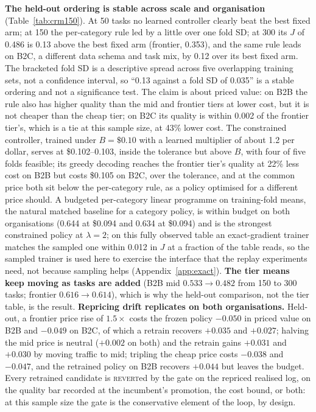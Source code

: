 \documentclass[10pt]{article}
\newcommand{\REVERT}{\textsc{revert}}
\newcommand{\finding}[1]{\textbf{\textcolor{pace}{#1}}}
\begin{document}
\finding{The held-out ordering is stable across scale and organisation} (Table~\ref{tab:crm150}). At 50 tasks no learned controller clearly beat the best fixed arm; at 150 the per-category rule led by a little over one fold SD; at 300 its $J$ of 0.486 is 0.13 above the best fixed arm (frontier, 0.353), and the same rule leads on B2C, a different data schema and task mix, by 0.12 over its best fixed arm. The bracketed fold SD is a descriptive spread across five overlapping training sets, not a confidence interval, so ``0.13 against a fold SD of 0.035'' is a stable ordering and not a significance test. The claim is about priced value: on B2B the rule also has higher quality than the mid and frontier tiers at lower cost, but it is not cheaper than the cheap tier; on B2C its quality is within 0.002 of the frontier tier's, which is a tie at this sample size, at 43\% lower cost. The constrained controller, trained under $B=\$0.10$ with a learned multiplier of about 1.2 per dollar, serves at \$0.102--0.103, inside the tolerance but above $B$, with four of five folds feasible; its greedy decoding reaches the frontier tier's quality at 22\% less cost on B2B but costs \$0.105 on B2C, over the tolerance, and at the common price both sit below the per-category rule, as a policy optimised for a different price should. A budgeted per-category linear programme on training-fold means, the natural matched baseline for a category policy, is within budget on both organisations (0.644 at \$0.094 and 0.634 at \$0.094) and is the strongest constrained policy at $\lambda=2$; on this fully observed table an exact-gradient trainer matches the sampled one within 0.012 in $J$ at a fraction of the table reads, so the sampled trainer is used here to exercise the interface that the replay experiments need, not because sampling helps (Appendix~\ref{app:exact}). \finding{The tier means keep moving as tasks are added} (B2B mid $0.533\to0.482$ from 150 to 300 tasks; frontier $0.616\to0.614$), which is why the held-out comparison, not the tier table, is the result. \finding{Repricing drift replicates on both organisations.} Held-out, a frontier price rise of $1.5\times$ costs the frozen policy $-0.050$ in priced value on B2B and $-0.049$ on B2C, of which a retrain recovers $+0.035$ and $+0.027$; halving the mid price is neutral ($+0.002$ on both) and the retrain gains $+0.031$ and $+0.030$ by moving traffic to mid; tripling the cheap price costs $-0.038$ and $-0.047$, and the retrained policy on B2B recovers $+0.044$ but leaves the budget. Every retrained candidate is \REVERT{}ed by the gate on the repriced realised log, on the quality bar recorded at the incumbent's promotion, the cost bound, or both: at this sample size the gate is the conservative element of the loop, by design.
\end{document}

